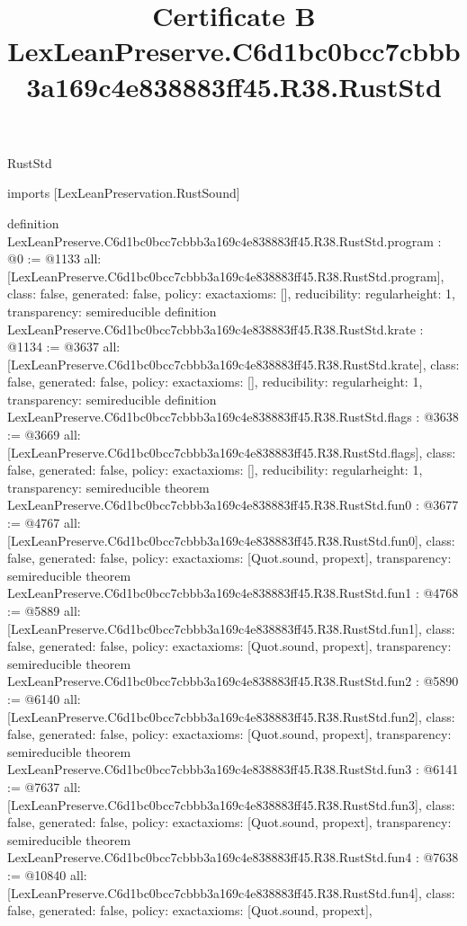 \begin{lexlean}{RustStd}
\title{Certificate B LexLeanPreserve.C6d1bc0bcc7cbbb3a169c4e838883ff45.R38.RustStd}
\begin{coremodule}
imports [LexLeanPreservation.RustSound]

definition LexLeanPreserve.C6d1bc0bcc7cbbb3a169c4e838883ff45.R38.RustStd.program : @0 := @1133 {
  all: [LexLeanPreserve.C6d1bc0bcc7cbbb3a169c4e838883ff45.R38.RustStd.program],
  class: false,
  generated: false,
  policy: exact{axioms: []},
  reducibility: regular{height: 1},
  transparency: semireducible
}
definition LexLeanPreserve.C6d1bc0bcc7cbbb3a169c4e838883ff45.R38.RustStd.krate : @1134 := @3637 {
  all: [LexLeanPreserve.C6d1bc0bcc7cbbb3a169c4e838883ff45.R38.RustStd.krate],
  class: false,
  generated: false,
  policy: exact{axioms: []},
  reducibility: regular{height: 1},
  transparency: semireducible
}
definition LexLeanPreserve.C6d1bc0bcc7cbbb3a169c4e838883ff45.R38.RustStd.flags : @3638 := @3669 {
  all: [LexLeanPreserve.C6d1bc0bcc7cbbb3a169c4e838883ff45.R38.RustStd.flags],
  class: false,
  generated: false,
  policy: exact{axioms: []},
  reducibility: regular{height: 1},
  transparency: semireducible
}
theorem LexLeanPreserve.C6d1bc0bcc7cbbb3a169c4e838883ff45.R38.RustStd.fun0 : @3677 := @4767 {
  all: [LexLeanPreserve.C6d1bc0bcc7cbbb3a169c4e838883ff45.R38.RustStd.fun0],
  class: false,
  generated: false,
  policy: exact{axioms: [Quot.sound, propext]},
  transparency: semireducible
}
theorem LexLeanPreserve.C6d1bc0bcc7cbbb3a169c4e838883ff45.R38.RustStd.fun1 : @4768 := @5889 {
  all: [LexLeanPreserve.C6d1bc0bcc7cbbb3a169c4e838883ff45.R38.RustStd.fun1],
  class: false,
  generated: false,
  policy: exact{axioms: [Quot.sound, propext]},
  transparency: semireducible
}
theorem LexLeanPreserve.C6d1bc0bcc7cbbb3a169c4e838883ff45.R38.RustStd.fun2 : @5890 := @6140 {
  all: [LexLeanPreserve.C6d1bc0bcc7cbbb3a169c4e838883ff45.R38.RustStd.fun2],
  class: false,
  generated: false,
  policy: exact{axioms: [Quot.sound, propext]},
  transparency: semireducible
}
theorem LexLeanPreserve.C6d1bc0bcc7cbbb3a169c4e838883ff45.R38.RustStd.fun3 : @6141 := @7637 {
  all: [LexLeanPreserve.C6d1bc0bcc7cbbb3a169c4e838883ff45.R38.RustStd.fun3],
  class: false,
  generated: false,
  policy: exact{axioms: [Quot.sound, propext]},
  transparency: semireducible
}
theorem LexLeanPreserve.C6d1bc0bcc7cbbb3a169c4e838883ff45.R38.RustStd.fun4 : @7638 := @10840 {
  all: [LexLeanPreserve.C6d1bc0bcc7cbbb3a169c4e838883ff45.R38.RustStd.fun4],
  class: false,
  generated: false,
  policy: exact{axioms: [Quot.sound, propext]},
}
\end{coremodule}
\end{lexlean}
